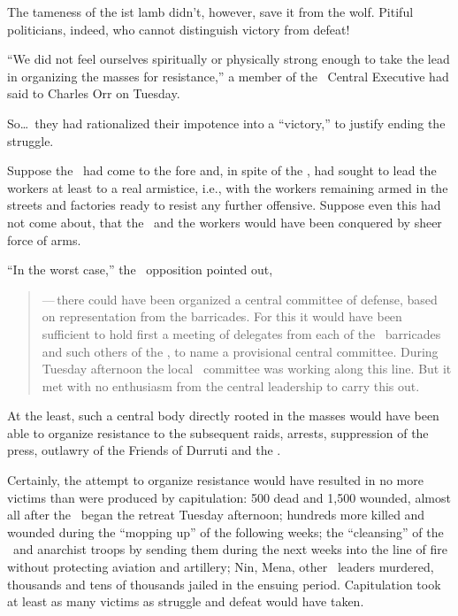 The tameness of the \POUM ist lamb didn’t, however, save it from the wolf. Pitiful politicians, indeed, who cannot distinguish victory from defeat!

``We did not feel ourselves spiritually or physically strong enough to take the lead in organizing the masses for resistance,'' a member of the \POUM\ Central Executive had said to Charles Orr on Tuesday.

So\dots\ they had rationalized their impotence into a ``victory,'' to justify ending the struggle.

Suppose the \POUM\ had come to the fore and, in spite of the \CNT, had sought to lead the workers at least to a real armistice, i.e., with the workers remaining armed in the streets and factories ready to resist any further offensive. Suppose even this had not come about, that the \POUM\ and the workers would have been conquered by sheer force of arms.

``In the worst case,'' the \POUM\ opposition pointed out,

\begin{quotation}
  \noindent
  —\,there could have been organized a central committee of defense, based on representation from the barricades. For this it would have been sufficient to hold first a meeting of delegates from each of the \POUM\ barricades and such others of the \CNT\kn, to name a provisional central committee. During Tuesday afternoon the local \POUM\ committee was working along this line. But it met with no enthusiasm from the central leadership to carry this out.
\end{quotation}

At the least, such a central body directly rooted in the masses would have been able to organize resistance to the subsequent raids, arrests, suppression of the press, outlawry of the Friends of Durruti and the \POUM\kn.

Certainly, the attempt to organize resistance would have resulted in no more victims than were produced by capitulation: 500 dead and 1,500 wounded, almost all after the \CNT\ began the retreat Tuesday afternoon; hundreds more killed and wounded during the ``mopping up'' of the following weeks; the ``cleansing'' of the \POUM\ and anarchist troops by sending them during the next weeks into the line of fire without protecting aviation and artillery; Nin, Mena, other \POUM\ leaders murdered, thousands and tens of thousands jailed in the ensuing period. Capitulation took at least as many victims as struggle and defeat would have taken.

